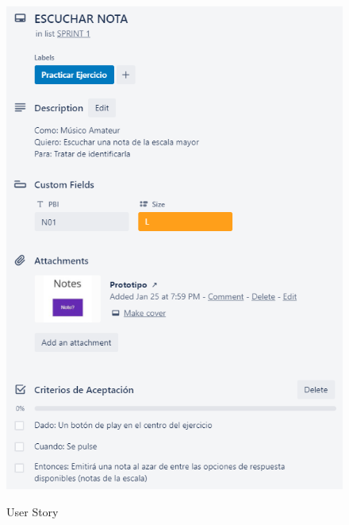 \documentclass[12pt,twoside,titlepage]{report}
\begin{document}
\begin{figure}[H]
    \centering
    \includegraphics[scale=1.3]{Scrum/User Stories/Notas}
    \label{fig:Notas}
    \caption{User Story}
\end{figure}
\end{document}
